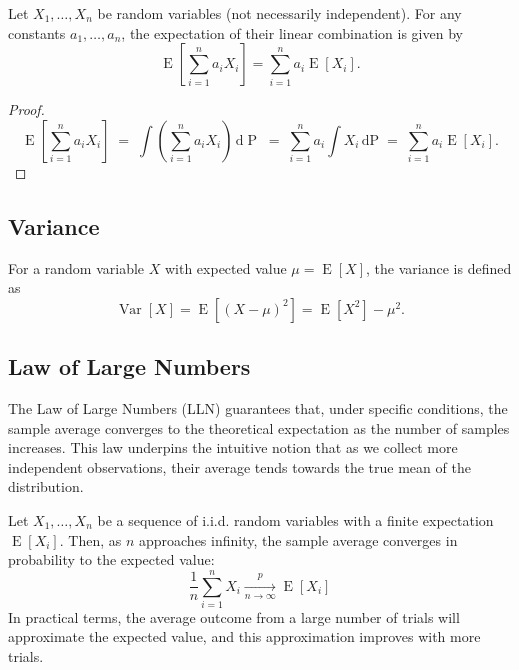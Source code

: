\documentclass[10pt, headings=standardclasses, parskip=half, twoside]{scrartcl}
\renewcommand{\emph}[1]{\textcolor{mypurple}{#1}}
\begin{document}
\begin{theorem}{}
    Let $X_{1}, \ldots, X_{n}$ be random variables (not necessarily independent). For any constants $a_{1}, \ldots, a_{n}$, the expectation of their linear combination is given by
    \[
    \operatorname{E}\left[\sum_{i=1}^{n} a_{i} X_{i}\right]=\sum_{i=1}^{n} a_{i} \operatorname{E}\left[X_{i}\right].
    \]
\end{theorem}

\begin{proof}
    \[
      \operatorname{E}\left[\sum_{i=1}^{n} a_i X_i\right]
      \;=\;
      \int \left(\sum_{i=1}^{n} a_i X_i\right)\,\mathrm{d}\operatorname{P}
        \;=\;
        \sum_{i=1}^n a_i \int X_i \,\mathrm{d}\mathrm{P}
        \;=\;
        \sum_{i=1}^n a_i \operatorname{E}[X_i].
    \]
\end{proof}


\subsection{Variance}
\begin{definition}[Variance]{}
    For a random variable $X$ with expected value $\mu = \operatorname{E}[X]$, the \emph{variance} is defined as
    \[
    \operatorname{Var}[X]=\operatorname{E}\left[(X-\mu)^{2}\right]=\operatorname{E}[X^{2}]-\mu^{2} \text{.}
    \]
\end{definition}



\subsection{Law of Large Numbers}

The Law of Large Numbers (LLN) guarantees that, under specific conditions, the sample average converges to the theoretical expectation as the number of samples increases. This law underpins the intuitive notion that as we collect more independent observations, their average tends towards the true mean of the distribution.
\begin{theorem}{}
    \label{thm:lln}
    Let $X_{1}, \ldots, X_{n}$ be a sequence of i.i.d. random variables with a finite expectation $\operatorname{E}[X_{i}]$. Then, as $n$ approaches infinity, the sample average converges in probability to the expected value:
    \[
    \frac{1}{n} \sum_{i=1}^{n} X_{i} \xrightarrow[n \rightarrow \infty]{p} \operatorname{E}[X_{i}]
    \]
    In practical terms, the average outcome from a large number of trials will approximate the expected value, and this approximation improves with more trials.
\end{theorem}
\end{document}
